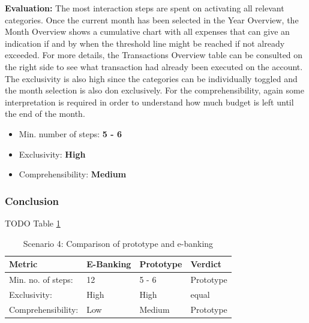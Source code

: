 \textbf{Evaluation:} The most interaction steps are spent on activating all relevant categories. Once the current month has been selected in the Year Overview, the Month Overview shows a cumulative chart with all expenses that can give an indication if and by when the threshold line might be reached if not already exceeded. For more details, the Transactions Overview table can be consulted on the right side to see what transaction had already been executed on the account. The exclusivity is also high since the categories can be individually toggled and the month selection is also don exclusively. For the comprehensibility, again some interpretation is required in order to understand how much budget is left until the end of the month.
\begin{itemize}[noitemsep,nolistsep]
	\item Min. number of steps: \textbf{5 - 6}
	\item Exclusivity: \textbf{High}
	\item Comprehensibility: \textbf{Medium}
\end{itemize}



\subsubsection{Conclusion}

TODO Table \ref{tbl:scenariofourcomparison}

\begin{table}[h]
	\begin{center}
		\begin{tabular}{ | p{3.2cm} | p{3.8cm} | p{3.5cm} | p{2.5cm} | }
			\hline
			\textbf{Metric} & \textbf{E-Banking} & \textbf{Prototype} & \textbf{Verdict} \\
			\hline
			Min. no. of steps: & 12 & 5 - 6 & Prototype \\
			\hline
			Exclusivity: & High & High & equal \\
			\hline
			Comprehensibility: & Low & Medium & Prototype \\
			\hline
		\end{tabular}
		\caption{Scenario 4: Comparison of prototype and e-banking}
		\label{tbl:scenariofourcomparison}
	\end{center}
\end{table}



